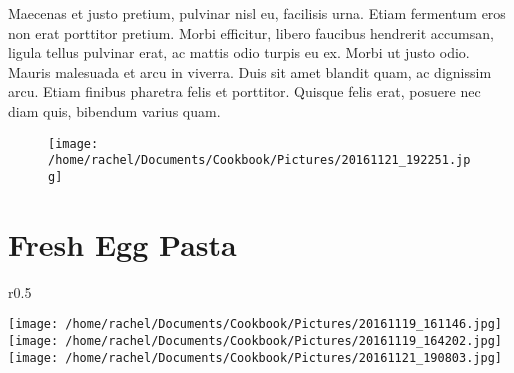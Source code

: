 \documentclass{article}
\begin{document}
Maecenas et justo pretium, pulvinar nisl eu, facilisis urna. Etiam fermentum eros non erat porttitor pretium. Morbi efficitur, libero faucibus hendrerit accumsan, ligula tellus pulvinar erat, ac mattis odio turpis eu ex. Morbi ut justo odio. Mauris malesuada et arcu in viverra. Duis sit amet blandit quam, ac dignissim arcu. Etiam finibus pharetra felis et porttitor. Quisque felis erat, posuere nec diam quis, bibendum varius quam.

\restoregeometry






\newpage
\begin{figure}[]
\texttt{[image: /home/rachel/Documents/Cookbook/Pictures/20161121\_192251.jpg]}
\end{figure}
\restoregeometry
\clearpage
\newpage
{}



\section*{\fontsize{25}{15}\selectfont Fresh Egg Pasta}

\begin{wrapfigure}{r}{0.5\textwidth}
\
  \begin{center}
 	\hfill\begin{minipage}{.5\textwidth}\centering
 	\vspace*{-4.3cm}
		\texttt{[image: /home/rachel/Documents/Cookbook/Pictures/20161119\_161146.jpg]}
		\\[5mm]
		\texttt{[image: /home/rachel/Documents/Cookbook/Pictures/20161119\_164202.jpg]}
		\\[5mm]
		\texttt{[image: /home/rachel/Documents/Cookbook/Pictures/20161121\_190803.jpg]}
	\end{minipage}  
	\end{center}

\end{wrapfigure}
\end{document}
